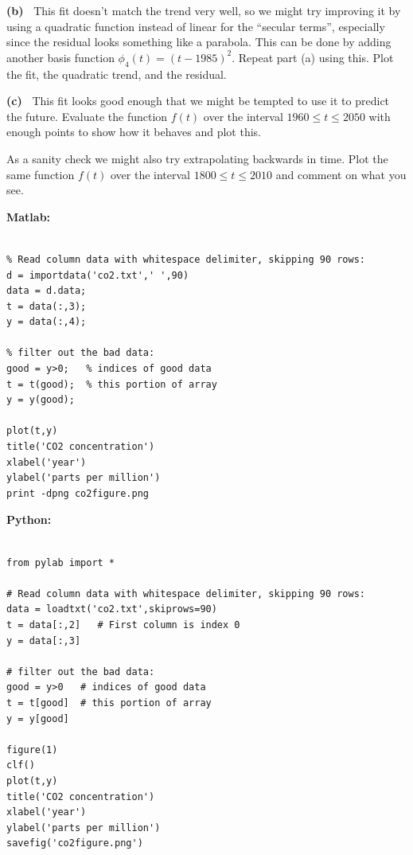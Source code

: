 \documentclass[10pt]{article}
\begin{document}
{\bf (b)~} This fit doesn't match the trend very well, so we might try
improving it by using a quadratic function instead of linear for the
``secular terms'', especially
since the residual looks something like a parabola.  This can be
done by adding another basis function $\phi_4(t) = (t-1985)^2$.  Repeat part
(a) using this.  Plot the fit, the quadratic trend, and the residual.

{\bf (c)~} 
This fit looks good enough that we might be tempted to use it to predict the
future.  Evaluate the function $f(t)$ over the interval $1960 \leq t \leq
2050$ with enough points to show how it behaves and plot this.

As a sanity check we might also try extrapolating backwards in time.  Plot
the same function $f(t)$ over the interval $1800 \leq t \leq 2010$ and
comment on what you see.  

\newpage
{\large\bf Matlab:}

\begin{verbatim}

% Read column data with whitespace delimiter, skipping 90 rows:
d = importdata('co2.txt',' ',90)
data = d.data;
t = data(:,3);
y = data(:,4);

% filter out the bad data:
good = y>0;   % indices of good data
t = t(good);  % this portion of array
y = y(good);

plot(t,y)
title('CO2 concentration')
xlabel('year')
ylabel('parts per million')
print -dpng co2figure.png

\end{verbatim} 

{\large\bf Python:}

\begin{verbatim} 

from pylab import *

# Read column data with whitespace delimiter, skipping 90 rows:
data = loadtxt('co2.txt',skiprows=90)
t = data[:,2]   # First column is index 0
y = data[:,3]

# filter out the bad data:
good = y>0   # indices of good data
t = t[good]  # this portion of array
y = y[good]

figure(1)
clf()
plot(t,y)
title('CO2 concentration')
xlabel('year')
ylabel('parts per million')
savefig('co2figure.png')

\end{verbatim} 
    




\end{document}
